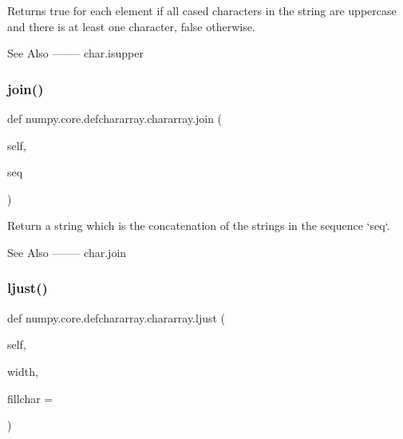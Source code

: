 \begin{DoxyVerb}Returns true for each element if all cased characters in the
string are uppercase and there is at least one character, false
otherwise.

See Also
--------
char.isupper\end{DoxyVerb}
 \mbox{\label{classnumpy_1_1core_1_1defchararray_1_1chararray_aeaf4f4f2854d3aaffd4f7bcf857eab8c}} 
\subsubsection{\texorpdfstring{join()}{join()}}
{\footnotesize\ttfamily def numpy.\+core.\+defchararray.\+chararray.\+join (\begin{DoxyParamCaption}\item[{}]{self,  }\item[{}]{seq }\end{DoxyParamCaption})}

\begin{DoxyVerb}Return a string which is the concatenation of the strings in the
sequence `seq`.

See Also
--------
char.join\end{DoxyVerb}
 \mbox{\label{classnumpy_1_1core_1_1defchararray_1_1chararray_ad5520990486134357f1d18d4fde6eb9f}} 
\subsubsection{\texorpdfstring{ljust()}{ljust()}}
{\footnotesize\ttfamily def numpy.\+core.\+defchararray.\+chararray.\+ljust (\begin{DoxyParamCaption}\item[{}]{self,  }\item[{}]{width,  }\item[{}]{fillchar = {\ttfamily \textquotesingle{}~\textquotesingle{}} }\end{DoxyParamCaption})}


